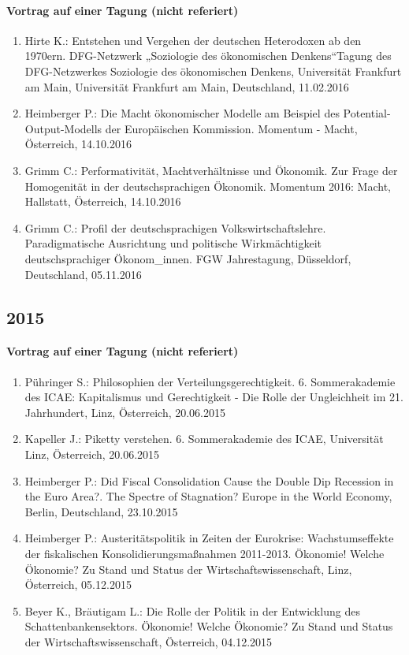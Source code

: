 \paragraph{Vortrag auf einer Tagung (nicht referiert)}
\begin{enumerate}
	\item Hirte K.: Entstehen und Vergehen der deutschen Heterodoxen ab den 1970ern. DFG-Netzwerk „Soziologie des ökonomischen Denkens“Tagung des DFG-Netzwerkes \glqq Soziologie des ökonomischen Denkens\grqq{}, Universität Frankfurt am Main, Universität Frankfurt am Main, Deutschland, 11.02.2016
	\item Heimberger P.: Die Macht ökonomischer Modelle am Beispiel des \glqq Potential-Output\grqq{}-Modells der Europäischen Kommission. Momentum - Macht, Österreich, 14.10.2016
	\item Grimm C.: Performativität, Machtverhältnisse und Ökonomik. Zur Frage der Homogenität in der deutschsprachigen Ökonomik. Momentum 2016: Macht, Hallstatt, Österreich, 14.10.2016
	\item Grimm C.: Profil der deutschsprachigen Volkswirtschaftslehre. Paradigmatische Ausrichtung und politische Wirkmächtigkeit deutschsprachiger Ökonom\_innen. FGW Jahrestagung, Düsseldorf, Deutschland, 05.11.2016
\end{enumerate}
\subsection*{2015}
\paragraph{Vortrag auf einer Tagung (nicht referiert)}
\begin{enumerate}
	\item Pühringer S.: Philosophien der Verteilungsgerechtigkeit. 6. Sommerakademie des ICAE: Kapitalismus und Gerechtigkeit - Die Rolle der Ungleichheit im 21. Jahrhundert, Linz, Österreich, 20.06.2015
	\item Kapeller J.: Piketty verstehen. 6. Sommerakademie des ICAE, Universität Linz, Österreich, 20.06.2015
	\item Heimberger P.: Did Fiscal Consolidation Cause the Double Dip Recession in the Euro Area?. The Spectre of Stagnation? Europe in the World Economy, Berlin, Deutschland, 23.10.2015
	\item Heimberger P.: Austeritätspolitik in Zeiten der Eurokrise: Wachstumseffekte der fiskalischen Konsolidierungsmaßnahmen 2011-2013. Ökonomie! Welche Ökonomie? Zu Stand und Status der Wirtschaftswissenschaft, Linz, Österreich, 05.12.2015
	\item Beyer K., Bräutigam L.: Die Rolle der Politik in der Entwicklung des Schattenbankensektors. Ökonomie! Welche Ökonomie? Zu Stand und Status der Wirtschaftswissenschaft, Österreich, 04.12.2015
\end{enumerate}
